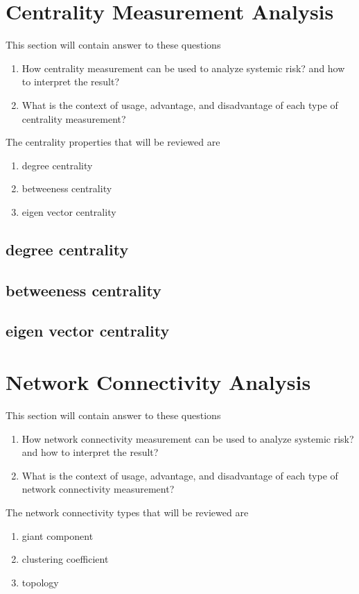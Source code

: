 \documentclass[a4paper,11pt]{article}
\begin{document}
\section{Centrality Measurement Analysis}
This section will contain answer to these questions
\begin{enumerate}
    \item How centrality measurement can be used to analyze systemic risk? and how to interpret the result?
    \item What is the context of usage, advantage, and disadvantage of each type of centrality measurement?
\end{enumerate}

The centrality properties that will be reviewed are
\begin{enumerate}
    \item degree centrality
    \item betweeness centrality
    \item eigen vector centrality
\end{enumerate}

\subsection{degree centrality}
\subsection{betweeness centrality}
\subsection{eigen vector centrality}


\section{Network Connectivity Analysis}
This section will contain answer to these questions
\begin{enumerate}
    \item How network connectivity measurement can be used to analyze systemic risk? and how to interpret the result?
    \item What is the context of usage, advantage, and disadvantage of each type of network connectivity measurement?
\end{enumerate}

The network connectivity types that will be reviewed are
\begin{enumerate}
    \item giant component 
    \item clustering coefficient 
    \item topology 
\end{enumerate}
\end{document}
